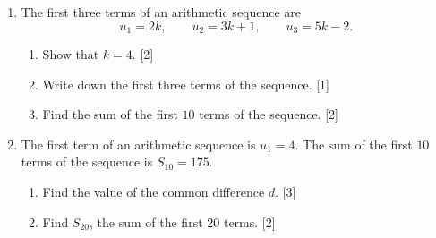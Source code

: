 \documentclass[12pt, twoside]{article}
\begin{document}
\begin{enumerate}[itemsep=0.15cm]
\newpage

\item[5.] [Maximum mark: 5]

The first three terms of an arithmetic sequence are
$$u_{1} = 2k, \qquad u_{2} = 3k + 1, \qquad u_{3} = 5k - 2.$$

\begin{enumerate}[itemsep=0.1cm]
  \item Show that $k = 4$. \hfill [2]
  \item Write down the first three terms of the sequence. \hfill [1]
  \item Find the sum of the first $10$ terms of the sequence. \hfill [2]
\end{enumerate}


\newpage

\item[6.] [Maximum mark: 5]

The first term of an arithmetic sequence is $u_{1} = 4$. The sum of
the first $10$ terms of the sequence is $S_{10} = 175$.

\begin{enumerate}[itemsep=0.1cm]
  \item Find the value of the common difference $d$. \hfill [3]
  \item Find $S_{20}$, the sum of the first $20$ terms. \hfill [2]
\end{enumerate}


\end{enumerate}
\end{document}
